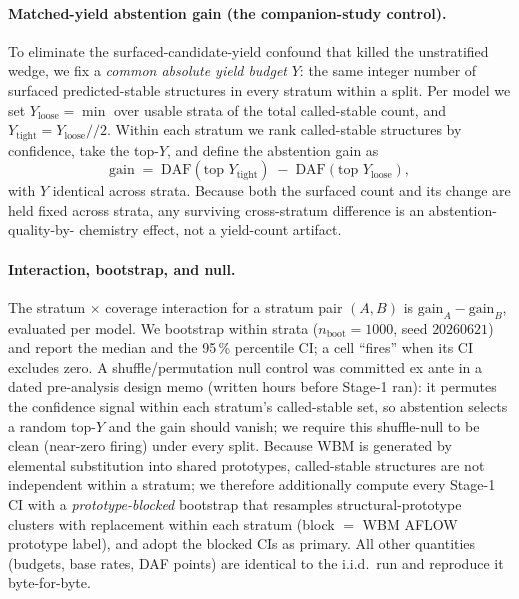 \documentclass[aip,jcp,preprint,superscriptaddress,amsmath,amssymb]{revtex4-2}
\begin{document}
\paragraph{Matched-yield abstention gain (the companion-study control).} To eliminate the
surfaced-candidate-yield confound that killed the unstratified wedge, we fix a \emph{common
absolute yield budget} $Y$: the same integer number of surfaced predicted-stable structures
in every stratum within a split. Per model we set $Y_{\mathrm{loose}} = \min$ over usable
strata of the total called-stable count, and $Y_{\mathrm{tight}} = Y_{\mathrm{loose}} // 2$.
Within each stratum we rank called-stable structures by confidence, take the top-$Y$, and
define the abstention gain as
\[
  \mathrm{gain} \;=\; \mathrm{DAF}(\text{top } Y_{\mathrm{tight}})
                    \;-\; \mathrm{DAF}(\text{top } Y_{\mathrm{loose}}),
\]
with $Y$ identical across strata. Because both the surfaced count and its change are held
fixed across strata, any surviving cross-stratum difference is an abstention-quality-by-
chemistry effect, not a yield-count artifact.

\paragraph{Interaction, bootstrap, and null.} The stratum $\times$ coverage interaction for a
stratum pair $(A,B)$ is $\mathrm{gain}_A - \mathrm{gain}_B$, evaluated per model. We bootstrap
within strata ($n_{\mathrm{boot}} = 1000$, seed $20260621$) and report the median and the
95\,\% percentile CI; a cell ``fires'' when its CI excludes zero. A shuffle/permutation
null control was committed ex ante in a dated pre-analysis design memo (written
hours before Stage-1 ran): it permutes the confidence signal within each
stratum's called-stable set, so abstention selects a random top-$Y$ and the gain should
vanish; we require this shuffle-null to be clean (near-zero firing) under every split.
Because WBM is generated by elemental substitution into shared prototypes, called-stable
structures are not independent within a stratum; we therefore additionally compute every
Stage-1 CI with a \emph{prototype-blocked} bootstrap that resamples
structural-prototype clusters with replacement within each stratum (block $=$ WBM
AFLOW prototype label), and adopt the blocked CIs as primary. All other quantities
(budgets, base rates, DAF points) are identical to the i.i.d.\ run and reproduce it
byte-for-byte.
\end{document}
